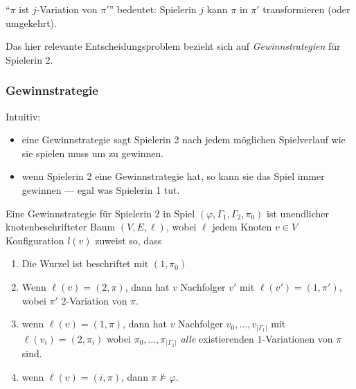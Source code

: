 \enquote{$\pi$ ist $j$-Variation von $\pi'$} bedeutet: Spielerin $j$ kann
$\pi$ in $\pi'$ transformieren (oder umgekehrt).

Das hier relevante Entscheidungsproblem bezieht sich auf \emph{Gewinnstrategien} für Spielerin 2.

\subsubsection{Gewinnstrategie}\label{definition-5.8-gewinnstrategie}

Intuitiv:

\begin{itemize}
  \item eine Gewinnstrategie sagt Spielerin 2 nach jedem möglichen Spielverlauf wie sie spielen muss um zu gewinnen.
  \item wenn Spielerin 2 eine Gewinnstrategie hat, so kann sie das Spiel immer gewinnen --- egal was Spielerin 1 tut.
\end{itemize}

\begin{definition}[Gewinnstrategie]

Eine  Gewinnstrategie für Spielerin $2$ in Spiel
$\left( \varphi,\Gamma_1,\Gamma_2,\pi_{0} \right)$ ist unendlicher
knotenbeschrifteter Baum $(V,E,\ell)$, wobei $\ell$ jedem Knoten
$v \in V$ Konfiguration $l(v)$ zuweist so, dass

\begin{enumerate}[label={(\alph*)}]
\item Die Wurzel ist beschriftet mit $\left( 1,\pi_{0} \right)$
\item Wenn $\ell\left( v \right) = (2,\pi)$, dann hat $v$ Nachfolger
  $v'$ mit $\ell\left( v' \right) = \left( 1,\pi' \right)$, wobei
  $\pi'$ $2$-Variation von $\pi$.
\item wenn $\ell\left( v \right) = (1,\pi)$, dann hat $v$ Nachfolger
  $v_{0},\ldots,v_{\left| \Gamma_1 \right|}$ mit
  $\ell\left( v_i \right) = (2,\pi_{i})$ wobei
  $\pi_{0},\ldots,\pi_{\left| \Gamma_1 \right|}$ \emph{alle} existierenden
  $1$-Variationen von $\pi$ sind.
\item wenn $\ell\left( v \right) = (i,\pi)$, dann
  $\pi \not\models \varphi$.
\end{enumerate}
\end{definition}

